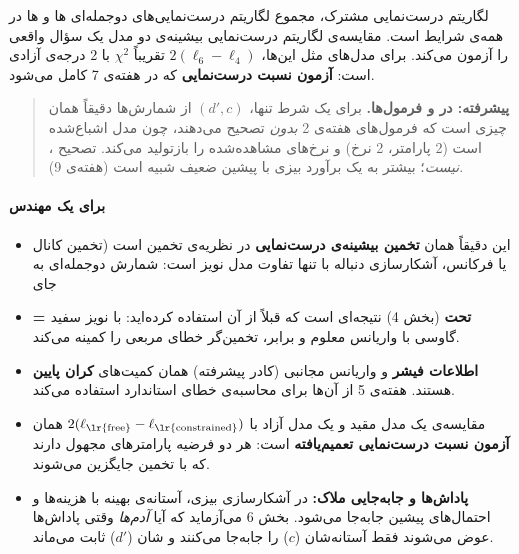 لگاریتم درست‌نمایی مشترک، مجموع لگاریتم درست‌نمایی‌های دوجمله‌ای ها
و ها در همه‌ی شرایط است. مقایسه‌ی لگاریتم درست‌نمایی
بیشینه‌ی دو مدل یک سؤال واقعی را آزمون می‌کند. برای مدل‌های  مثل
این‌ها، \(2(\ell_{6} - \ell_{4})\) تقریباً \(\chi^2\) با 2 درجه‌ی آزادی
است: \textbf{آزمون نسبت درست‌نمایی} که در هفته‌ی 7 کامل می‌شود.

\begin{quote}
\textbf{پیشرفته:  در  و فرمول‌ها.} برای یک شرط تنها،
 \((d', c)\) از شمارش‌ها دقیقاً همان چیزی است که فرمول‌های هفته‌ی 2
\emph{بدون} تصحیح می‌دهند، چون مدل اشباع‌شده است (2 پارامتر، 2 نرخ) و
 نرخ‌های مشاهده‌شده را بازتولید می‌کند. تصحیح ،
 \emph{نیست}؛ بیشتر به یک برآورد بیزی با پیشین ضعیف شبیه است
(هفته‌ی 9).
\end{quote}

\paragraph{برای یک مهندس}

\begin{itemize}
\tightlist
\item
  این دقیقاً همان \textbf{تخمین بیشینه‌ی درست‌نمایی} در نظریه‌ی تخمین است
  (تخمین  کانال یا فرکانس، آشکارسازی دنباله با  تنها
  تفاوت مدل نویز است: شمارش دوجمله‌ای به جای 
\item
  \textbf{ =  تحت } (بخش 4) نتیجه‌ای است که قبلاً
  از آن استفاده کرده‌اید: با نویز سفید گاوسی با واریانس معلوم و برابر،
  تخمین‌گر  خطای مربعی را کمینه می‌کند.
\item
  \textbf{اطلاعات فیشر } و واریانس مجانبی
   (کادر پیشرفته) همان کمیت‌های \textbf{کران پایین
  } هستند. هفته‌ی 5 از آن‌ها برای محاسبه‌ی خطای استاندارد
  استفاده می‌کند.
\item
  مقایسه‌ی یک مدل مقید و یک مدل آزاد با
  \(2(\ell_{\text{\lr{free}}} - \ell_{\text{\lr{constrained}}})\) همان
  \textbf{آزمون نسبت درست‌نمایی تعمیم‌یافته } است: هر دو فرضیه
  پارامترهای مجهول دارند که با تخمین  جایگزین می‌شوند.
\item
  \textbf{پاداش‌ها و جابه‌جایی ملاک:} در آشکارسازی بیزی، آستانه‌ی بهینه با
  هزینه‌ها و احتمال‌های پیشین جابه‌جا می‌شود. بخش 6 می‌آزماید که آیا
  \emph{آدم‌ها} وقتی پاداش‌ها عوض می‌شوند فقط آستانه‌شان (\(c\)) را جابه‌جا
  می‌کنند و شان (\(d'\)) ثابت می‌ماند.
\end{itemize}

